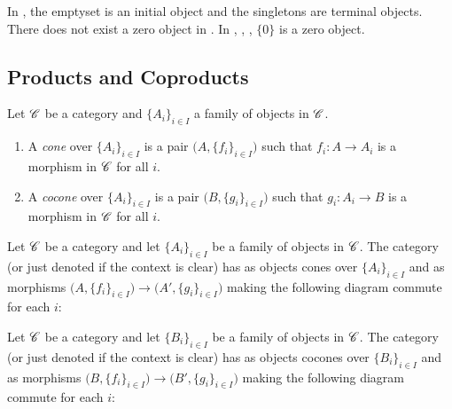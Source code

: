 \begin{example}
	In , the emptyset is an initial object and the singletons are terminal objects. There does not exist a zero object in . In , , , $\{0\}$ is a zero object.
\end{example}

\subsection{Products and Coproducts}


\begin{definition}
	Let $\mathscr{C}$ be a category and $\{A_i\}_{i \in I}$ a family of objects in $\mathscr{C}$.
	\mbox{}
	\begin{enumerate}[label = (\arabic*),itemsep=1pt,topsep=3pt]
		\item A \emph{cone} over $\{A_i\}_{i \in I}$ is a pair $\bigl( A,\{f_i\}_{i \in I} \bigr)$ such that $f_i:A \rightarrow A_i$ is a morphism in $\mathscr{C}$ for all $i$.
		\item A \emph{cocone} over $\{A_i\}_{i \in I}$ is a pair $\bigl( B, \{g_i\}_{i \in I} \bigr)$ such that $g_i:A_i \rightarrow B$ is a morphism in $\mathscr{C}$ for all $i$.
	\end{enumerate}
\end{definition}

\begin{example}
	Let $\mathscr{C}$ be a category and let $\{A_i\}_{i \in I}$ be a family of objects in $\mathscr{C}$. The category  (or just denoted  if the context is clear) has as objects cones over $\{A_i\}_{i \in I}$ and as morphisms $\bigl( A,\{f_i\}_{i \in I} \bigr) \rightarrow \bigl( A', \{g_i\}_{i \in I} \bigr)$ making the following diagram commute for each $i$:
	\begin{center}
	\end{center}
\end{example}

\begin{example}
	Let $\mathscr{C}$ be a category and let $\{B_i\}_{i \in I}$ be a family of objects in $\mathscr{C}$. The category  (or just denoted  if the context is clear) has as objects cocones over $\{B_i\}_{i \in I}$ and as morphisms $\bigl( B,\{f_i\}_{i \in I} \bigr) \rightarrow \bigl( B', \{g_i\}_{i \in I} \bigr)$ making the following diagram commute for each $i$:
	\begin{center}
	\end{center}
\end{example}

